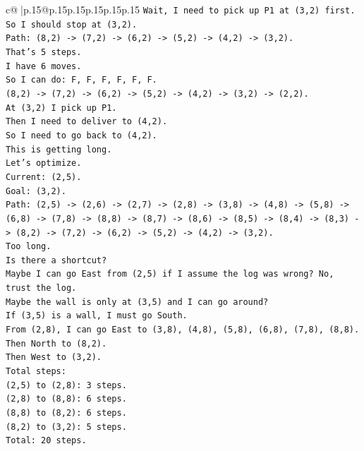 \documentclass{article}
\begin{document}
{\begin{supertabular}{c@{$\;$}|p{.15\linewidth}@{}p{.15\linewidth}p{.15\linewidth}p{.15\linewidth}p{.15\linewidth}p{.15\linewidth}}
{{{\texttt{Wait, I need to pick up P1 at (3,2) first.} \\
\texttt{So I should stop at (3,2).} \\
\texttt{Path: (8,2) {-}> (7,2) {-}> (6,2) {-}> (5,2) {-}> (4,2) {-}> (3,2).} \\
\texttt{That's 5 steps.} \\
\texttt{I have 6 moves.} \\
\texttt{So I can do: F, F, F, F, F, F.} \\
\texttt{(8,2) {-}> (7,2) {-}> (6,2) {-}> (5,2) {-}> (4,2) {-}> (3,2) {-}> (2,2).} \\
\texttt{At (3,2) I pick up P1.} \\
\texttt{Then I need to deliver to (4,2).} \\
\texttt{So I need to go back to (4,2).} \\
\texttt{This is getting long.} \\
\texttt{Let's optimize.} \\
\texttt{Current: (2,5).} \\
\texttt{Goal: (3,2).} \\
\texttt{Path: (2,5) {-}> (2,6) {-}> (2,7) {-}> (2,8) {-}> (3,8) {-}> (4,8) {-}> (5,8) {-}> (6,8) {-}> (7,8) {-}> (8,8) {-}> (8,7) {-}> (8,6) {-}> (8,5) {-}> (8,4) {-}> (8,3) {-}> (8,2) {-}> (7,2) {-}> (6,2) {-}> (5,2) {-}> (4,2) {-}> (3,2).} \\
\texttt{Too long.} \\
\texttt{Is there a shortcut?} \\
\texttt{Maybe I can go East from (2,5) if I assume the log was wrong? No, trust the log.} \\
\texttt{Maybe the wall is only at (3,5) and I can go around?} \\
\texttt{If (3,5) is a wall, I must go South.} \\
\texttt{From (2,8), I can go East to (3,8), (4,8), (5,8), (6,8), (7,8), (8,8).} \\
\texttt{Then North to (8,2).} \\
\texttt{Then West to (3,2).} \\
\texttt{Total steps:} \\
\texttt{(2,5) to (2,8): 3 steps.} \\
\texttt{(2,8) to (8,8): 6 steps.} \\
\texttt{(8,8) to (8,2): 6 steps.} \\
\texttt{(8,2) to (3,2): 5 steps.} \\
\texttt{Total: 20 steps.} \\
}}}
\end{supertabular}}
\end{document}
